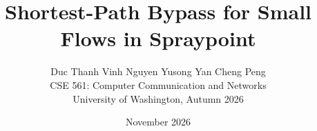 \documentclass[11pt]{article}
\title{Shortest-Path Bypass for Small Flows in Spraypoint}
\author{Duc Thanh Vinh Nguyen \qquad Yusong Yan \qquad Cheng Peng\\[0.6em]
  \normalsize CSE 561: Computer Communication and Networks\\
  \normalsize University of Washington, Autumn 2026}
\date{November 2026}
\begin{document}
\maketitle

\begin{abstract}

\end{abstract}










\clearpage



\clearpage
\appendix


\end{document}
